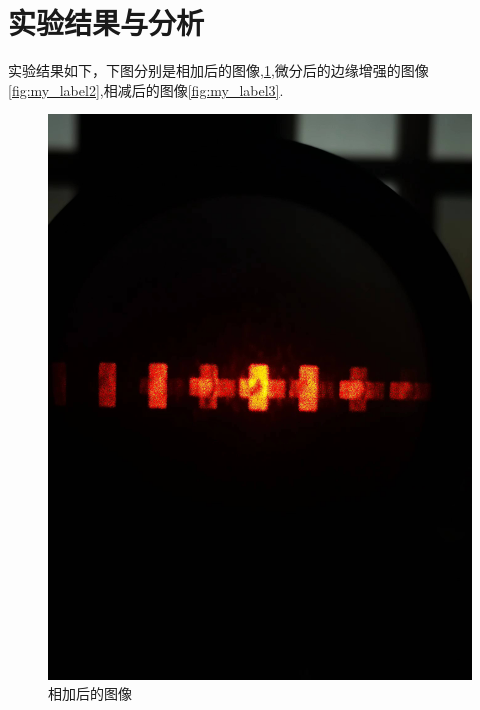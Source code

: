 \documentclass{buaaemp}
\begin{document}
\section{实验结果与分析}
实验结果如下，下图分别是相加后的图像,\ref{fig:my_label1},微分后的边缘增强的图像\ref{fig:my_label2},相减后的图像\ref{fig:my_label3}.
\begin{figure}
    \centering
    \includegraphics[width=\linewidth]{image/微信图片_20221109232920.jpg}
    \caption{相加后的图像}
    \label{fig:my_label1}
\end{figure}
\end{document}
